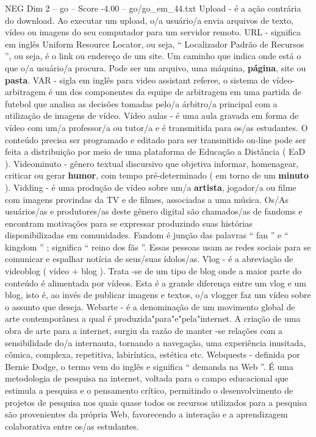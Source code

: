 \begin{textsample}{NEG Dim 2 – go – Score -4.00 – go/go\_em\_44.txt}
Upload - é a ação contrária do download.
Ao executar um upload, o/a usuário/a envia arquivos de texto, vídeo ou imagens do seu computador para um servidor remoto.
URL - significa em inglês Uniform Resource Locator, ou seja, “ Localizador Padrão de Recursos ”, ou seja, é o link ou endereço de um site.
Um caminho que indica onde está o que o/a usuário/a procura.
Pode ser um arquivo, uma máquina, \textbf{página}, site ou \textbf{pasta}.
VAR - sigla em inglês para video assistant referee, o sistema de vídeo-arbitragem é um dos componentes da equipe de arbitragem em uma partida de futebol que analisa as decisões tomadas pelo/a árbitro/a principal com a utilização de imagens de vídeo.
Vídeo aulas - é uma aula gravada em forma de vídeo com um/a professor/a ou tutor/a e é transmitida para os/as estudantes.
O conteúdo precisa ser programado e editado para ser transmitido on-line pode ser feita a distribuição por meio de uma plataforma de Educação a Distância ( EaD ).
Videominuto - gênero textual discursivo que objetiva informar, homenagear, criticar ou gerar \textbf{humor}, com tempo pré-determinado ( em torno de um \textbf{minuto} ).
Vidding - é uma produção de vídeo sobre um/a \textbf{artista}, jogador/a ou filme com imagens provindas da TV e de filmes, associadas a uma música.
Os/As usuários/as e produtores/as deste gênero digital são chamados/as de fandoms e encontram motivações para se expressar produzindo suas histórias disponibilizadas em comunidades.
Fandom é junção das palavras “ fan ” e “ kingdom ” ; significa “ reino dos fãs ”.
Essas pessoas usam as redes sociais para se comunicar e espalhar notícia de seus/suas ídolos/as.
Vlog - é a abreviação de videoblog ( vídeo + blog ).
Trata -se de um tipo de blog onde a maior parte do conteúdo é alimentada por vídeos.
Esta é a grande diferença entre um vlog e um blog, isto é, ao invés de publicar imagens e textos, o/a vlogger faz um vídeo sobre o assunto que deseja.
Webarte - é a denominação de um movimento global de arte contemporânea a qual é produzida"para"e"pela"internet.
A criação de uma obra de arte para a internet, surgiu da razão de manter -se relações com a sensibilidade do/a internauta, tornando a navegação, uma experiência inusitada, cômica, complexa, repetitiva, labiríntica, estética etc.
Webquests - definida por Bernie Dodge, o termo vem do inglês e significa “ demanda na Web ”.
É uma metodologia de pesquisa na internet, voltada para o campo educacional que estimula a pesquisa e o pensamento crítico, permitindo o desenvolvimento de projetos de pesquisa nos quais quase todos os recursos utilizados para a pesquisa são provenientes da própria Web, favorecendo a interação e a aprendizagem colaborativa entre os/as estudantes.

\end{textsample}
